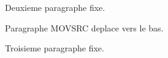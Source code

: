 \documentclass[11pt,a4paper]{article}
\begin{document}
Deuxieme paragraphe fixe.

Paragraphe MOVSRC deplace vers le bas.

Troisieme paragraphe fixe.
\end{document}
